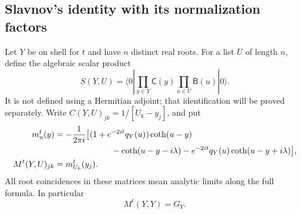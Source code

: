 \subsection{Slavnov's identity with its normalization factors}

Let $Y$ be on shell for $t$ and have $n$ distinct real roots.  For a
list $U$ of length $n$, define the algebraic scalar product
\begin{equation}\label{eq:ABA-scalar}
 S(Y,U)=\langle0|\prod_{y\in Y}\mathsf C(y)
                         \prod_{u\in U}\mathsf B(u)|0\rangle.
\end{equation}
It is not defined using a Hermitian adjoint; that identification will
be proved separately.  Write $C(Y,U)_{jk}=1/[U_k-y_j]$, and put
\begin{align}
 m_u^t(y)&=-\frac1{2\pi i}\bigl[(1+e^{-2it}q_Y(u))\coth(u-y)
                 \notag\\
 &\hspace{24mm}-\coth(u-y-i\lambda)
                 -e^{-2it}q_Y(u)\coth(u-y+i\lambda)\bigr],
 \label{eq:finite-source-column}\\
 M^t(Y,U)_{jk}&=m_{U_k}^t(y_j).
 \label{eq:reduced-scalar-matrix}
\end{align}
All root coincidences in these matrices mean analytic limits along
the full formula.  In particular
\begin{equation}\label{eq:source-Gaudin-limit}
 M^t(Y,Y)=G_Y.
\end{equation}

